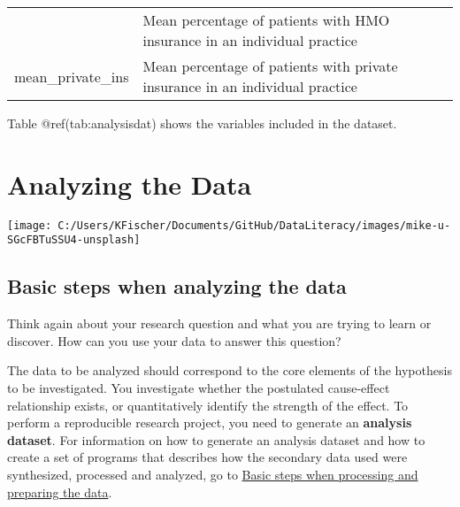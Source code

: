 \documentclass[
]{book}
\begin{document}
\begin{longtable}[]{@{}ll@{}}
\begin{minipage}[t]{0.18\columnwidth}
\end{minipage} & \begin{minipage}[t]{0.76\columnwidth}\raggedright
Mean percentage of patients with HMO insurance in an individual
practice\strut
\end{minipage}\tabularnewline
\begin{minipage}[t]{0.18\columnwidth}\raggedright
mean\_private\_ins\strut
\end{minipage} & \begin{minipage}[t]{0.76\columnwidth}\raggedright
Mean percentage of patients with private insurance in an individual
practice\strut
\end{minipage}\tabularnewline
\bottomrule
\end{longtable}

Table @ref(tab:analysisdat) shows the variables included in the dataset.

\hypertarget{analyzing}{%
\chapter{Analyzing the Data}\label{analyzing}}

\begin{center}\texttt{[image: C:/Users/KFischer/Documents/GitHub/DataLiteracy/images/mike-u-SGcFBTuSSU4-unsplash]} \end{center}

\hypertarget{basic-steps-when-analyzing-the-data}{%
\section{Basic steps when analyzing the
data}\label{basic-steps-when-analyzing-the-data}}

Think again about your research question and what you are trying to
learn or discover. How can you use your data to answer this question?

The data to be analyzed should correspond to the core elements of the
hypothesis to be investigated. You investigate whether the postulated
cause-effect relationship exists, or quantitatively identify the
strength of the effect. To perform a reproducible research project, you
need to generate an \textbf{analysis dataset}. For information on how to
generate an analysis dataset and how to create a set of programs that
describes how the secondary data used were synthesized, processed and
analyzed, go to
\protect\hyperlink{ux5cux23-Basic-steps-when-processing-and-preparing-the-data}{Basic
steps when processing and preparing the data}.
\end{document}
